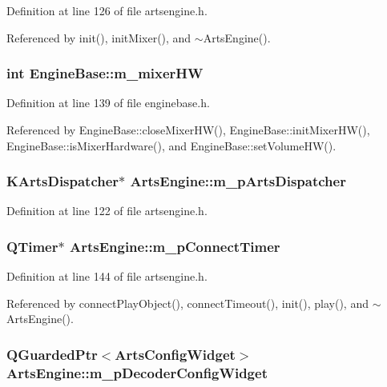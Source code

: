 Definition at line 126 of file artsengine.h.

Referenced by init(), init\-Mixer(), and $\sim$Arts\-Engine().
\subsubsection{\setlength{\rightskip}{0pt plus 5cm}int {\bf Engine\-Base::m\_\-mixer\-HW}\hspace{0.3cm}{\tt  [protected, inherited]}}\label{classEngineBase_EngineBasep0}




Definition at line 139 of file enginebase.h.

Referenced by Engine\-Base::close\-Mixer\-HW(), Engine\-Base::init\-Mixer\-HW(), Engine\-Base::is\-Mixer\-Hardware(), and Engine\-Base::set\-Volume\-HW().
\subsubsection{\setlength{\rightskip}{0pt plus 5cm}KArts\-Dispatcher$\ast$ {\bf Arts\-Engine::m\_\-p\-Arts\-Dispatcher}\hspace{0.3cm}{\tt  [private]}}\label{classArtsEngine_ArtsEnginer0}




Definition at line 122 of file artsengine.h.
\subsubsection{\setlength{\rightskip}{0pt plus 5cm}QTimer$\ast$ {\bf Arts\-Engine::m\_\-p\-Connect\-Timer}\hspace{0.3cm}{\tt  [private]}}\label{classArtsEngine_ArtsEnginer18}




Definition at line 144 of file artsengine.h.

Referenced by connect\-Play\-Object(), connect\-Timeout(), init(), play(), and $\sim$Arts\-Engine().
\subsubsection{\setlength{\rightskip}{0pt plus 5cm}QGuarded\-Ptr$<${\bf Arts\-Config\-Widget}$>$ {\bf Arts\-Engine::m\_\-p\-Decoder\-Config\-Widget}\hspace{0.3cm}{\tt  [private]}}\label{classArtsEngine_ArtsEnginer17}




